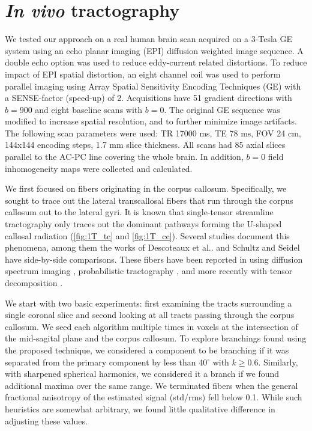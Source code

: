 \documentclass[letterpaper,hyperref,12pt]{gatech-thesis}
\makeatletter
\renewcommand{\deg}{\ensuremath{^\circ}\xspace}
\DeclareRobustCommand\onedot{\futurelet\@let@token\@onedot}
\def\@onedot{\ifx\@let@token.\else.\null\fi\xspace}
\newcommand{\etal}{et al\onedot}
\newcommand{\bn}[1]{\ensuremath{b\!=\!#1}\xspace}
\makeatother
\begin{document}
\section{\textit{In vivo} tractography}  \label{sec:real}

We tested our approach on a real human brain scan acquired on a 3-Tesla GE
system using an echo planar imaging (EPI) diffusion weighted image sequence.
A double echo option was used to reduce eddy-current related distortions.  To
reduce impact of EPI spatial distortion, an eight channel coil was used to
perform parallel imaging using Array Spatial Sensitivity Encoding Techniques
(GE) with a SENSE-factor (speed-up) of 2.  Acquisitions have 51 gradient
directions with \bn{900} and eight baseline scans with \bn{0}.  The original
GE sequence was modified to increase spatial resolution, and to further
minimize image artifacts.  The following scan parameters were used: TR 17000
ms, TE 78 ms, FOV 24 cm, 144x144 encoding steps, 1.7 mm slice thickness. All
scans had 85 axial slices parallel to the AC-PC line covering the whole brain.
In addition, \bn{0} field inhomogeneity maps were collected and calculated.

We first focused on fibers originating in the corpus callosum.  Specifically,
we sought to trace out the lateral transcallosal fibers that run through the
corpus callosum out to the lateral gyri.  It is known that single-tensor
streamline tractography only traces out the dominant pathways forming the
U-shaped callosal radiation (\autoref{fig:1T_tc} and \autoref{fig:1T_cc}).
Several studies document this phenomena, among them the works of Descoteaux
\etal\cite{Descoteaux2009tmi} and Schultz and Seidel \cite{Schultz2008} have
side-by-side comparisons.  These fibers have been reported in using diffusion
spectrum imaging \cite{Hagmann2004}, probabilistic tractography
\cite{Kaden2007,Anwander2007,Descoteaux2009tmi}, and more recently with tensor
decomposition \cite{Schultz2008}.


We start with two basic experiments:  first examining the tracts surrounding a
single coronal slice and second looking at all tracts passing through the
corpus callosum.  We seed each algorithm multiple times in voxels at the
intersection of the mid-sagital plane and the corpus callosum.  To explore
branchings found using the proposed technique, we considered a component to be
branching if it was separated from the primary component by less than 40\deg
with $k\ge0.6$.  Similarly, with sharpened spherical harmonics, we considered
it a branch if we found additional maxima over the same range.  We terminated
fibers when the general fractional anisotropy of the estimated signal
(std/rms) fell below 0.1.  While such heuristics are somewhat arbitrary, we
found little qualitative difference in adjusting these values.
\end{document}

